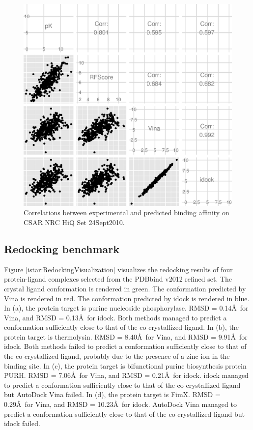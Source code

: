 \begin{figure}
\begin{center}
\includegraphics[width=\linewidth]{../istar/CSAR2010Correlations.eps}
\end{center}
\caption{Correlations between experimental and predicted binding affinity on CSAR NRC HiQ Set 24Sept2010.}
\label{istar:CSAR2010Correlations}
\end{figure}

\subsection{Redocking benchmark}

Figure \ref{istar:RedockingVisualization} visualizes the redocking results of four protein-ligand complexes selected from the PDBbind v2012 refined set. The crystal ligand conformation is rendered in green. The conformation predicted by Vina is rendered in red. The conformation predicted by idock is rendered in blue. In (a), the protein target is purine nucleoside phosphorylase. RMSD = 0.14\AA\ for Vina, and RMSD = 0.13\AA\ for idock. Both methods managed to predict a conformation sufficiently close to that of the co-crystallized ligand. In (b), the protein target is thermolysin. RMSD = 8.40\AA\ for Vina, and RMSD = 9.91\AA\ for idock. Both methods failed to predict a conformation sufficiently close to that of the co-crystallized ligand, probably due to the presence of a zinc ion in the binding site. In (c), the protein target is bifunctional purine biosynthesis protein PURH. RMSD = 7.06\AA\ for Vina, and RMSD = 0.21\AA\ for idock. idock managed to predict a conformation sufficiently close to that of the co-crystallized ligand but AutoDock Vina failed. In (d), the protein target is FimX. RMSD = 0.29\AA\ for Vina, and RMSD = 10.23\AA\ for idock. AutoDock Vina managed to predict a conformation sufficiently close to that of the co-crystallized ligand but idock failed.

